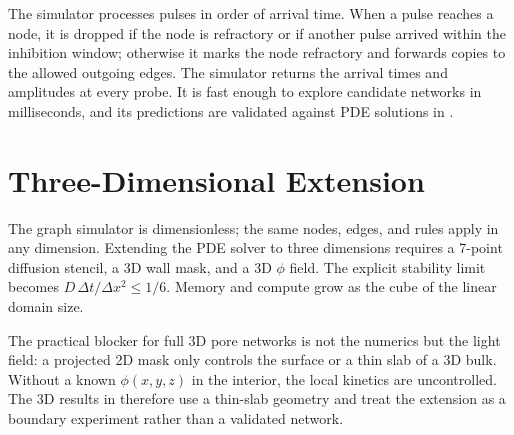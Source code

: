 The simulator processes pulses in order of arrival time.
When a pulse reaches a node, it is dropped if the node is refractory or if another pulse arrived within the inhibition window; otherwise it marks the node refractory and forwards copies to the allowed outgoing edges.
The simulator returns the arrival times and amplitudes at every probe.
It is fast enough to explore candidate networks in milliseconds, and its predictions are validated against PDE solutions in .

\section{Three-Dimensional Extension}
\label{sec:meth_3d}

The graph simulator is dimensionless; the same nodes, edges, and rules apply in any dimension.
Extending the PDE solver to three dimensions requires a 7-point diffusion stencil, a 3D wall mask, and a 3D $\phi$ field.
The explicit stability limit becomes $D\,\Delta t / \Delta x^{2} \leq 1/6$.
Memory and compute grow as the cube of the linear domain size.

The practical blocker for full 3D pore networks is not the numerics but the light field: a projected 2D mask only controls the surface or a thin slab of a 3D bulk.
Without a known $\phi(x,y,z)$ in the interior, the local kinetics are uncontrolled.
The 3D results in  therefore use a thin-slab geometry and treat the extension as a boundary experiment rather than a validated network.
